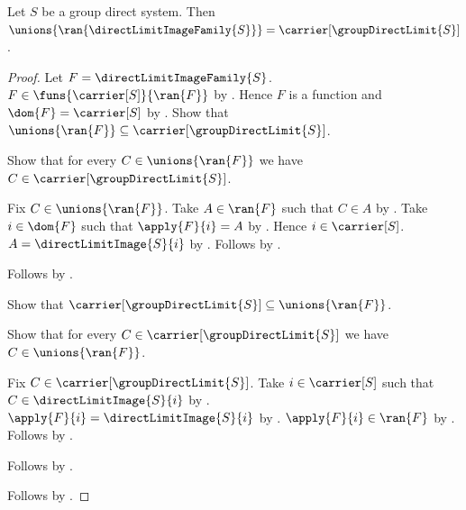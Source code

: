 \begin{theorem}\label{direct_limit_images_cover_carrier}
    Let $S$ be a group direct system.
    Then $\unions{\ran{\directLimitImageFamily{S}}}
        =\carrier[\groupDirectLimit{S}]$.
\end{theorem}
\begin{proof}
    Let $F=\directLimitImageFamily{S}$.
    $F\in\funs{\carrier[S]}{\ran{F}}$ by
        .
    Hence $F$ is a function and $\dom{F}=\carrier[S]$ by
        .
    Show that $\unions{\ran{F}}\subseteq
        \carrier[\groupDirectLimit{S}]$.
    \begin{subproof}
        Show that for every $C\in\unions{\ran{F}}$ we have
            $C\in\carrier[\groupDirectLimit{S}]$.
        \begin{subproof}
            Fix $C\in\unions{\ran{F}}$.
            Take $A\in\ran{F}$ such that $C\in A$ by
                .
            Take $i\in\dom{F}$ such that $\apply{F}{i}=A$ by
                .
            Hence $i\in\carrier[S]$.
            $A=\directLimitImage{S}{i}$ by
                .
            Follows by
                .
        \end{subproof}
        Follows by .
    \end{subproof}
    Show that $\carrier[\groupDirectLimit{S}]\subseteq
        \unions{\ran{F}}$.
    \begin{subproof}
        Show that for every $C\in\carrier[\groupDirectLimit{S}]$ we have
            $C\in\unions{\ran{F}}$.
        \begin{subproof}
            Fix $C\in\carrier[\groupDirectLimit{S}]$.
            Take $i\in\carrier[S]$ such that
                $C\in\directLimitImage{S}{i}$ by
                .
            $\apply{F}{i}=\directLimitImage{S}{i}$ by
                .
            $\apply{F}{i}\in\ran{F}$ by
                .
            Follows by .
        \end{subproof}
        Follows by .
    \end{subproof}
    Follows by .
\end{proof}

